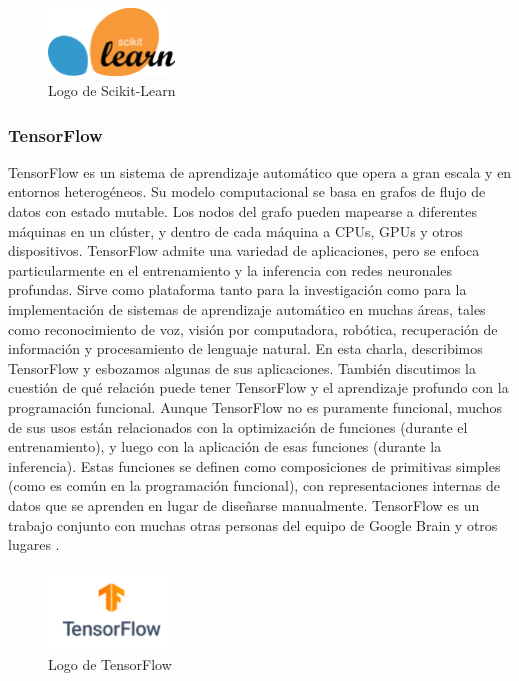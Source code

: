 \begin{figure}[!htbp]
  \centering
  \includegraphics[width=0.3\textwidth]{imagenes/02-marco-teorico/scikit-logo.png}
  \caption[Logo de Scikit-Learn]{Logo de Scikit-Learn \cite{scikit-learn}}
  \label{fig:scikit-learn-logo}
\end{figure}

\subsubsection{TensorFlow}

TensorFlow es un sistema de aprendizaje automático que opera a gran escala y en
entornos heterogéneos. Su modelo computacional se basa en grafos de flujo de
datos con estado mutable. Los nodos del grafo pueden mapearse a diferentes
máquinas en un clúster, y dentro de cada máquina a CPUs, GPUs y otros
dispositivos. TensorFlow admite una variedad de aplicaciones, pero se enfoca
particularmente en el entrenamiento y la inferencia con redes neuronales
profundas. Sirve como plataforma tanto para la investigación como para la
implementación de sistemas de aprendizaje automático en muchas áreas, tales
como reconocimiento de voz, visión por computadora, robótica, recuperación de
información y procesamiento de lenguaje natural. En esta charla, describimos
TensorFlow y esbozamos algunas de sus aplicaciones. También discutimos la
cuestión de qué relación puede tener TensorFlow y el aprendizaje profundo con
la programación funcional. Aunque TensorFlow no es puramente funcional, muchos
de sus usos están relacionados con la optimización de funciones (durante el
entrenamiento), y luego con la aplicación de esas funciones (durante la
inferencia). Estas funciones se definen como composiciones de primitivas
simples (como es común en la programación funcional), con representaciones
internas de datos que se aprenden en lugar de diseñarse manualmente. TensorFlow
es un trabajo conjunto con muchas otras personas del equipo de Google Brain y
otros lugares \cite{abadi2016tensorflow}.

\begin{figure}[!htbp]
  \centering
  \includegraphics[width=0.3\textwidth]{imagenes/02-marco-teorico/tensorflow-logo.png}
  \caption[Logo de TensorFlow]{Logo de TensorFlow \cite{abadi2016tensorflow}}
  \label{fig:tensorflow-logo}
\end{figure}

